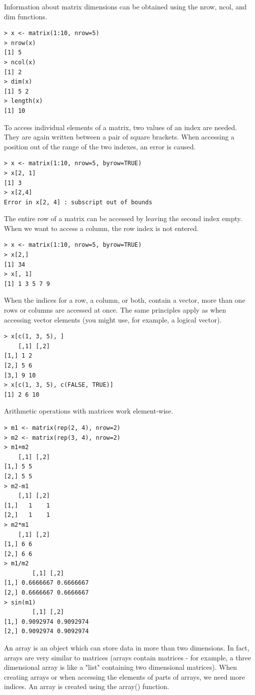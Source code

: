 \documentclass[11pt,openany,executivepaper]{book}
\begin{document}
Information about matrix dimensions can be obtained using the nrow, ncol, and dim functions.

\begin{verbatim}
> x <- matrix(1:10, nrow=5)
> nrow(x)
[1] 5
> ncol(x)
[1] 2
> dim(x)
[1] 5 2
> length(x)
[1] 10
\end{verbatim}

To access individual elements of a matrix, two values of an index are needed. They are again written between a pair of square brackets. When accessing a position out of the range of the two indexes, an error is caused.

\begin{verbatim}
> x <- matrix(1:10, nrow=5, byrow=TRUE)
> x[2, 1]
[1] 3
> x[2,4]
Error in x[2, 4] : subscript out of bounds
\end{verbatim}

The entire row of a matrix can be accessed by leaving the second index empty. When we want to access a column, the row index is not entered.

\begin{verbatim}
> x <- matrix(1:10, nrow=5, byrow=TRUE)
> x[2,]
[1] 34
> x[, 1]
[1] 1 3 5 7 9
\end{verbatim}

When the indices for a row, a column, or both, contain a vector, more than one rows or columns are accessed at once. The same principles apply as when accessing vector elements (you might use, for example, a logical vector).

\begin{verbatim}
> x[c(1, 3, 5), ]
    [,1] [,2]
[1,] 1 2
[2,] 5 6
[3,] 9 10
> x[c(1, 3, 5), c(FALSE, TRUE)]
[1] 2 6 10
\end{verbatim}

Arithmetic operations with matrices work element-wise.

\begin{verbatim}
> m1 <- matrix(rep(2, 4), nrow=2)
> m2 <- matrix(rep(3, 4), nrow=2)
> m1+m2
    [,1] [,2]
[1,] 5 5
[2,] 5 5
> m2-m1
    [,1] [,2]
[1,]   1    1
[2,]   1    1
> m2*m1
    [,1] [,2]
[1,] 6 6
[2,] 6 6
> m1/m2
        [,1] [,2]
[1,] 0.6666667 0.6666667
[2,] 0.6666667 0.6666667
> sin(m1)
        [,1] [,2]
[1,] 0.9092974 0.9092974
[2,] 0.9092974 0.9092974
\end{verbatim}

An array is an object which can store data in more than two dimensions. In fact, arrays are very similar to matrices (arrays contain matrices - for example, a three dimensional array is like a "list" containing two dimensional matrices). When creating arrays or when accessing the elements of parts of arrays, we need more indices. An array is created using the array() function.
\end{document}

